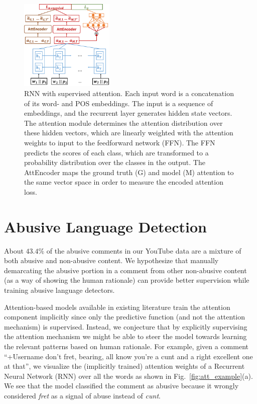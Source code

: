 \documentclass[letterpaper]{article} %
\begin{document}
\begin{figure}[h!]
\captionsetup{font=normalsize}
\centering
\includegraphics[width=0.4\textwidth]{model.pdf}
\caption{RNN with supervised attention. Each input word is a concatenation of its word- and POS embeddings. The input is a sequence of embeddings, and the recurrent layer generates hidden state vectors. The attention module determines the attention distribution over these hidden vectors, which are linearly weighted with the attention weights to  input to the feedforward network (FFN). The FFN  predicts the scores of each class, which are transformed to a probability distribution over the classes in the output. The AttEncoder maps the ground truth (G) and model (M) attention to the same vector space in order to measure the encoded attention loss.}
\label{rnn_supervised_attetnion}
\end{figure}


\section{Abusive Language Detection}
\label{sec:detection}
About $43.4\%$ of the abusive comments in our YouTube data are a mixture of both abusive and non-abusive content. We hypothesize that manually demarcating the abusive portion in a comment from other non-abusive content (as a way of showing the human rationale) can provide better supervision while training  abusive language detectors.

Attention-based models available in existing literature train the attention component implicitly since only the predictive function (and not the attention mechanism) is supervised.
Instead, we conjecture that by explicitly supervising the attention mechanism we might be able to steer the model towards learning the relevant patterns based on human rationale. For example, given a comment ``+Username don't fret, bearing, all know you're a cunt and a right excellent one at that'', we visualize the (implicitly trained) attention weights of a Recurrent Neural Network (RNN) over all the words as shown in Fig.~\ref{fig:att_example}(a).
We see that the model classified the comment as abusive because it wrongly considered \textit{fret} as a signal of abuse instead of \textit{cunt}.
\end{document}
